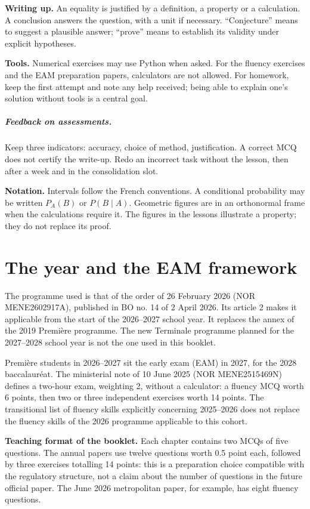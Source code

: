 \textbf{Writing up.} An equality is justified by a definition, a property or a calculation. A conclusion answers the question, with a unit if necessary. ``Conjecture'' means to suggest a plausible answer; ``prove'' means to establish its validity under explicit hypotheses.

\textbf{Tools.} Numerical exercises may use Python when asked. For the fluency exercises and the EAM preparation papers, calculators are not allowed. For homework, keep the first attempt and note any help received; being able to explain one's solution without tools is a central goal.

\ifprof\paragraph{Feedback on assessments.} Keep three indicators: accuracy, choice of method, justification. A correct MCQ does not certify the write-up. Redo an incorrect task without the lesson, then after a week and in the consolidation slot.\fi

\textbf{Notation.} Intervals follow the French conventions. A conditional probability may be written $P_A(B)$ or $P(B\mid A)$. Geometric figures are in an orthonormal frame when the calculations require it. The figures in the lessons illustrate a property; they do not replace its proof.

\chapter*{The year and the EAM framework}
The programme used is that of the order of 26 February 2026 (NOR MENE2602917A), published in BO no. 14 of 2 April 2026. Its article 2 makes it applicable from the start of the 2026--2027 school year. It replaces the annex of the 2019 Première programme. The new Terminale programme planned for the 2027--2028 school year is not the one used in this booklet.

Première students in 2026--2027 sit the early exam (EAM) in 2027, for the 2028 baccalauréat. The ministerial note of 10 June 2025 (NOR MENE2515469N) defines a two-hour exam, weighting 2, without a calculator: a fluency MCQ worth 6 points, then two or three independent exercises worth 14 points. The transitional list of fluency skills explicitly concerning 2025--2026 does not replace the fluency skills of the 2026 programme applicable to this cohort.

\textbf{Teaching format of the booklet.} Each chapter contains two MCQs of five questions. The annual papers use twelve questions worth 0.5 point each, followed by three exercises totalling 14 points: this is a preparation choice compatible with the regulatory structure, not a claim about the number of questions in the future official paper. The June 2026 metropolitan paper, for example, has eight fluency questions.

